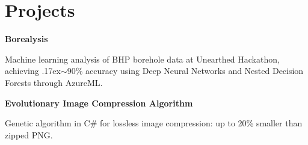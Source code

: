 \documentclass[a4paper]{article}
\renewenvironment{itemize}{
  \begin{list}{}{
    \setlength{\leftmargin}{1.5em}
  }
}{
  \end{list}
}
\newcommand{\dateitem}[1] {\item[\textbf{#1 :}]}
\renewcommand{\tilde} {{\raise.17ex\hbox{$\scriptstyle\mathtt{\sim}$}}}
\newcommand{\accentcolour}{\color{darkgray}}
\newcommand{\resumesection}[1]{\section*{\accentcolour #1}}
\renewcommand{\accentcolour}{\color{NavyBlue}}
\renewcommand{\resumesection}[1]{\section*{\accentcolour #1}}
\begin{document}
\resumesection{Projects}
\begin{itemize}
	
	\dateitem{2016} {\textbf{Borealysis}
		
		Machine learning analysis of BHP borehole data at Unearthed Hackathon, achieving \tilde{}90\% accuracy using Deep Neural Networks and Nested Decision Forests through AzureML.
	}


	
	\dateitem{2013} {\textbf{Evolutionary Image Compression Algorithm}
		
		Genetic algorithm in C\# for lossless image compression: up to 20\% smaller than zipped PNG.
	}
	
\end{itemize}

\bigskip

\end{document}
